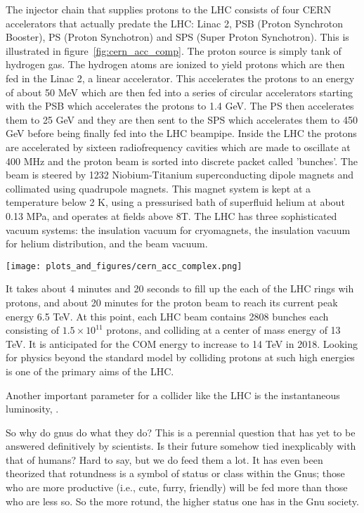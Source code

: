 The injector chain that supplies protons to the LHC consists of four CERN accelerators that actually predate the LHC: Linac 2, PSB (Proton Synchroton Booster), PS (Proton Synchotron) and SPS (Super Proton Synchotron). This is illustrated in figure~\ref{fig:cern_acc_comp}. The proton source is simply tank of hydrogen gas. The hydrogen atoms are ionized to yield protons which are then fed in the Linac 2, a linear accelerator. This accelerates the protons to an energy of about 50 MeV which are then fed into a series of circular accelerators starting with the PSB which accelerates the protons to 1.4 GeV. The PS then accelerates them to 25 GeV and they are then sent to the SPS which accelerates them to 450 GeV before being finally fed into the LHC beampipe. Inside the LHC the protons are accelerated by sixteen radiofrequency cavities which are made to oscillate at 400 MHz and the proton beam is sorted into discrete packet called 'bunches'. The beam is steered by 1232 Niobium-Titanium superconducting dipole magnets and collimated using quadrupole magnets. This magnet system is kept at a temperature below 2 K, using a pressurised bath of superfluid helium at about 0.13 MPa, and operates at fields above 8T. The LHC has three sophisticated vacuum systems: the insulation vacuum for cryomagnets, the insulation vacuum for  helium  distribution, and the beam vacuum.

\begin{figure*}
\begin{center}
\texttt{[image: plots\_and\_figures/cern\_acc\_complex.png]}
\caption{Cern Accelerator Complex}
\label{fig:cern_acc_comp}
\end{center}
\end{figure*}


It takes about 4 minutes and 20 seconds to fill up the each of the LHC rings wih protons, and about 20 minutes for the proton beam to reach its current peak energy 6.5 TeV. At this point, each LHC beam contains 2808 bunches each consisting of $1.5 \times 10^{11}$ protons, and colliding at a center of mass energy of 13 TeV. It is anticipated for the COM energy to increase to 14 TeV in 2018. Looking for physics beyond the standard model by colliding protons at such high energies is one of the primary aims of the LHC.

Another important parameter for a collider like the LHC is the instantaneous luminosity, .




So why do gnus do what they do?  This is a perennial question that has
yet to be answered definitively by scientists.  Is their future
somehow tied inexplicably with that of humans?  Hard to say, but we do
feed them a lot.  It has even been theorized that rotundness is a
symbol of status or class within the Gnus; those who are more
productive (i.e., cute, furry, friendly) will be fed more than those
who are less so.  So the more rotund, the higher status one has in the
Gnu society.

